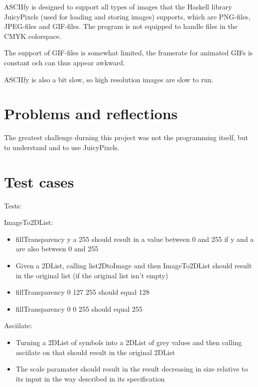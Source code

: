 \documentclass[12pt, a4paper]{article}
\begin{document}
	ASCIIfy is designed to support all types of images that the Haskell library JuicyPixels (used for loading and storing images) supports, which are PNG-files, JPEG-files and GIF-files. The program is not equipped to handle files in the CMYK colorspace. 

	The support of GIF-files is somewhat limited, the framerate for animated GIFs is constant och can thus appear awkward. 

	ASCIIfy is also a bit slow, so high resolution images are slow to run.

		

	\section{Problems and reflections}
		
		The greatest challenge durning this project was not the programming itself, but to understand and to use JuicyPixels. 

		

	\section{Test cases}

	Tests:

		ImageTo2DList:
		\begin{itemize}
			\item{fillTransparency y a 255 should result in a value
			      between 0 and 255 if y and a are also between 0
						and 255}
			\item{Given a 2DList, calling list2DtoImage and then
			      ImageTo2DList should result in the original list
						(if the original list isn't empty)}
			\item{fillTransparency 0 127 255 should equal 128}
			\item{fillTransparency 0 0 255 should equal 255}
		\end{itemize}

		Asciilate:
		\begin{itemize}
			\item{Turning a 2DList of symbols into a 2DList of
			      grey values and then calling asciilate on that
						should result in the original 2DList}
			\item{The scale paramater should result in the result
			      decreasing in size relative to its input in the
						way described in its specification}
			\end{itemize}
		
\end{document}
